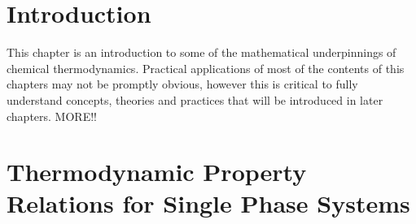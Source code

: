\localtableofcontents
   

\section{Introduction}\label{Chapter:ThermodynamicPropertiesPureFluids:Section:Introduction}
   This chapter is an introduction to some of the mathematical underpinnings of chemical thermodynamics. Practical applications of most of the contents of this chapters may not be promptly obvious, however this is critical to fully understand concepts, theories and practices that will be introduced in later chapters. MORE!!

\section{Thermodynamic Property Relations for Single Phase Systems}\label{Chapter:ThermodynamicPropertiesPureFluids:Section:ThermodynamicPropertiesSinglePhase}
